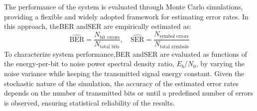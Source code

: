 The performance of the system is evaluated through Monte Carlo simulations, providing a flexible and widely adopted framework for estimating error rates. In this approach, the\gls{BER} and\gls{SER} are empirically estimated as:
\begin{equation}
    \widehat{\text{BER}} = \frac{N_{\text{bit errors}}}{N_{\text{total bits}}}, \quad
    \widehat{\text{SER}} = \frac{N_{\text{symbol errors}}}{N_{\text{total symbols}}}
\end{equation}
To characterize system performance,\gls{BER} and\gls{SER} are evaluated as functions of the energy-per-bit to noise power spectral density ratio, $E_b/N_0$, by varying the noise variance while keeping the transmitted signal energy constant. Given the stochastic nature of the simulation, the accuracy of the estimated error rates depends on the number of transmitted bits or until a predefined number of errors is observed, ensuring statistical reliability of the results.